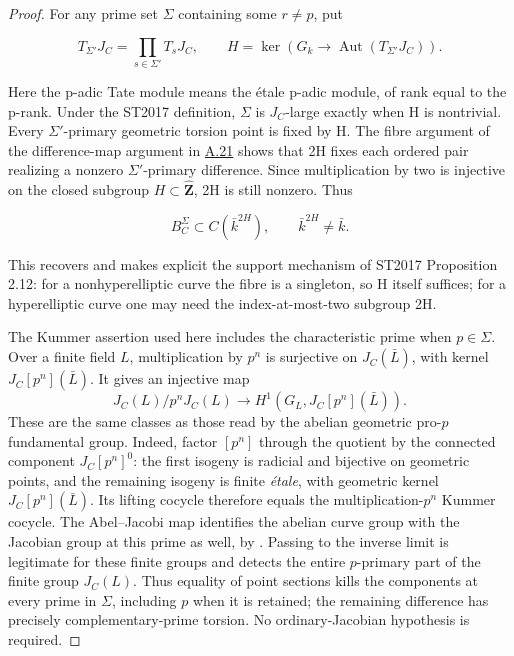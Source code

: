 \documentclass[11pt,a4paper]{article}
\newcommand{\statementref}[1]{\hyperlink{#1}{#1}}
\begin{document}
\begin{proof}

For any prime set \({\Sigma}\) containing some \(r\ne p\), put

\[T_{\Sigma'}J_C=\prod_{s\in\Sigma'}T_sJ_C,\qquad H=\ker(G_k\to\operatorname{Aut}(T_{\Sigma'}J_C)).\]

Here the p-adic Tate module means the étale p-adic module, of rank equal to the p-rank. Under the ST2017 definition, \({\Sigma}\) is \(J_C\)-large exactly when H is nontrivial. Every \({\Sigma}'\)-primary geometric torsion point is fixed by H. The fibre argument of the difference-map argument in \statementref{A.21} shows that 2H fixes each ordered pair realizing a nonzero \({\Sigma}'\)-primary difference. Since multiplication by two is injective on the closed subgroup \(H{\subset}\widehat{\mathbf Z}\), 2H is still nonzero. Thus

\[B_C^\Sigma\subset C(\bar k^{2H}),\qquad \bar k^{2H}\ne\bar k.\]

This recovers and makes explicit the support mechanism of ST2017 Proposition 2.12: for a nonhyperelliptic curve the fibre is a singleton, so H itself suffices; for a hyperelliptic curve one may need the index-at-most-two subgroup 2H.

The Kummer assertion used here includes the characteristic prime when
$p\in\Sigma$. Over a finite field $L$, multiplication by $p^n$ is
surjective on $J_C(\bar L)$, with kernel $J_C[p^n](\bar L)$.
It gives an injective map
\[
 J_C(L)/p^nJ_C(L)\longrightarrow
 H^1(G_L,J_C[p^n](\bar L)).
\]
These are the same classes as those read by the abelian geometric
pro-$p$ fundamental group. Indeed, factor $[p^n]$ through the
quotient by the connected component $J_C[p^n]^0$: the first
isogeny is radicial and bijective on geometric points, and the
remaining isogeny is finite \emph{\'etale}, with geometric kernel
$J_C[p^n](\bar L)$. Its lifting cocycle therefore equals the
multiplication-$p^n$ Kummer cocycle. The Abel--Jacobi map identifies
the abelian curve group with the Jacobian group at this prime as
well, by \cite[Proposition 9.1]{MilneJac}. Passing to the inverse
limit is legitimate for these finite groups and detects the entire
$p$-primary part of the finite group $J_C(L)$. Thus equality of
point sections kills the components at every prime in $\Sigma$,
including $p$ when it is retained; the remaining difference has
precisely complementary-prime torsion. No ordinary-Jacobian
hypothesis is required.


\end{proof}
\end{document}
